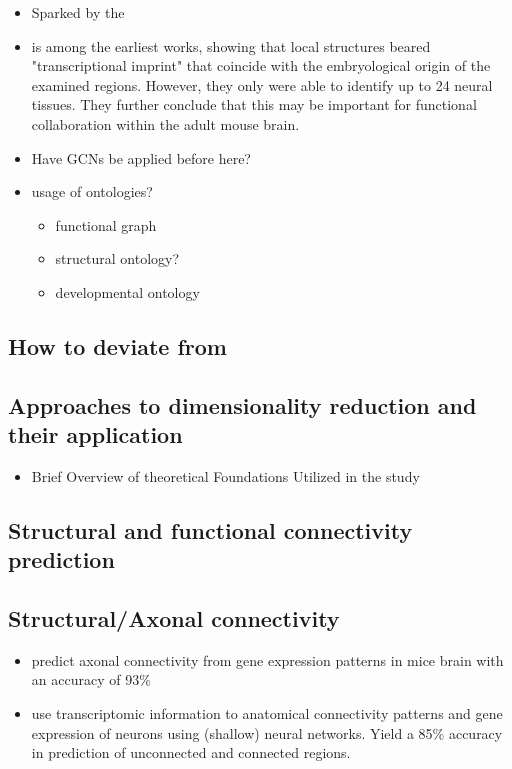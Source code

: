 \documentclass[]{article}
\renewcommand{\cite}{\citep}
\begin{document}
\begin{itemize}
	\item Sparked by the \citet{MouseBrainAtlas}
	\item \cite{zapala2005adult} is among the earliest works, showing that local structures beared "transcriptional imprint" that coincide with the embryological origin of the examined regions. However, they only were able to identify up to 24 neural tissues. They further conclude that this may be important for functional collaboration within the adult mouse brain.
\end{itemize}
\begin{itemize}
	\item Have GCNs be applied before here?
	\item usage of ontologies?
	\begin{itemize}
		\item functional graph \cite{ValkShapingBrainStructure2020}
		\item structural ontology?
		\item developmental ontology
	\end{itemize}
\end{itemize}

\subsection*{How to deviate from \cite{Partel2020}}

\subsection{Approaches to dimensionality reduction and their application}
\begin{itemize}
	\item Brief Overview of theoretical Foundations Utilized in the study
\end{itemize}

\subsection{Structural and functional connectivity prediction}
\subsection*{Structural/Axonal connectivity}

\begin{itemize}
	\item \cite{fakhry2015high} predict axonal connectivity from gene expression patterns in mice brain with an accuracy of 93\%
	\item \cite{roberti2019exploiting} use transcriptomic information to anatomical connectivity patterns and gene expression of neurons using (shallow) neural networks. Yield a 85\% accuracy in prediction of unconnected and connected regions.
	
\end{itemize}
\end{document}
